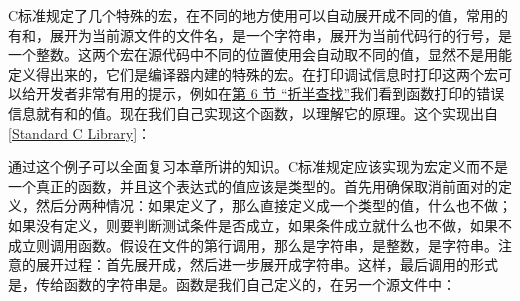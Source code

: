 C标准规定了几个特殊的宏，在不同的地方使用可以自动展开成不同的值，常用的有和，展开为当前源文件的文件名，是一个字符串，展开为当前代码行的行号，是一个整数。这两个宏在源代码中不同的位置使用会自动取不同的值，显然不是用能定义得出来的，它们是编译器内建的特殊的宏。在打印调试信息时打印这两个宏可以给开发者非常有用的提示，例如在\hyperlink{db.ch11s06.id2746698}{第 6 节 “折半查找”}我们看到函数打印的错误信息就有和的值。现在我们自己实现这个函数，以理解它的原理。这个实现出自\hyperlink{db.bi01.bibli.standardclib}{[Standard C Library]}：





通过这个例子可以全面复习本章所讲的知识。C标准规定应该实现为宏定义而不是一个真正的函数，并且这个表达式的值应该是类型的。首先用确保取消前面对的定义，然后分两种情况：如果定义了，那么直接定义成一个类型的值，什么也不做；如果没有定义，则要判断测试条件是否成立，如果条件成立就什么也不做，如果不成立则调用函数。假设在文件的第行调用，那么是字符串，是整数，是字符串。注意的展开过程：首先展开成，然后进一步展开成字符串\BookCode{\BookQuoteChar{}33\BookQuoteChar{}}。这样，最后调用的形式是，传给函数的字符串是。函数是我们自己定义的，在另一个源文件中：


